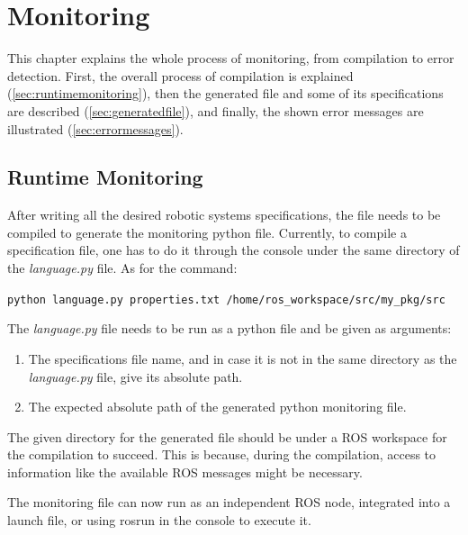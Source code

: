 \chapter{Monitoring}
\label{chap:monitoring}

This chapter explains the whole process of monitoring, from compilation to error detection. First, the overall process of compilation is explained (\autoref{sec:runtimemonitoring}), then the generated file and some of its specifications are described (\autoref{sec:generatedfile}), and finally, the shown error messages are illustrated (\autoref{sec:errormessages}).


\section{Runtime Monitoring}
\label{sec:runtimemonitoring}

After writing all the desired robotic systems specifications, the file needs to be compiled to generate the monitoring python file. Currently, to compile a specification file, one has to do it through the console under the same directory of the \textit{language.py} file. As for the command:

\texttt{python language.py properties.txt /home/ros\_workspace/src/my\_pkg/src}

The \textit{language.py} file needs to be run as a python file and be given as arguments:

\begin{enumerate}
    \item The specifications file name, and in case it is not in the same directory as the \textit{language.py} file, give its absolute path.
    \item The expected absolute path of the generated python monitoring file.
\end{enumerate}

The given directory for the generated file should be under a ROS workspace for the compilation to succeed. This is because, during the compilation, access to information like the available ROS messages might be necessary.

The monitoring file can now run as an independent ROS node, integrated into a launch file, or using rosrun in the console to execute it.


